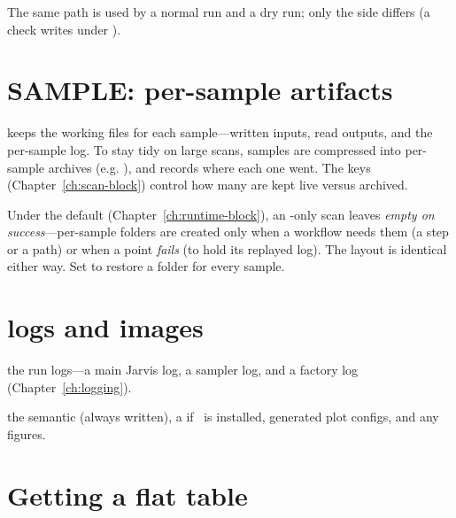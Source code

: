 \begin{jnote}
The same  path is used by a normal run and a  dry run; only
the  side differs (a check writes under ).
\end{jnote}

\section{SAMPLE: per-sample artifacts}
\label{sec:out-sample}

 keeps the working files for each sample---written inputs, read outputs, and the
per-sample log. To stay tidy on large scans, samples are compressed into per-sample archives
(e.g. ), and  records where each one
went. The  keys (Chapter~\ref{ch:scan-block}) control how many are
kept live versus archived.

\begin{jnote}
Under the default  (Chapter~\ref{ch:runtime-block}), an
-only scan leaves  \emph{empty on success}---per-sample folders are
created only when a workflow needs them (a  step or a  path) or
when a point \emph{fails} (to hold its replayed log). The  layout is identical either
way. Set  to restore a folder for every sample.
\end{jnote}

\section{logs and images}
\label{sec:out-logs-images}

\begin{description}[style=nextline, leftmargin=1.2em]
  \item[\file{logs/<scan>/}] the run logs---a main Jarvis log, a sampler log, and a factory log
        (Chapter~\ref{ch:logging}).
  \item[\file{images/<scan>/}] the semantic  (always written), a
         if \JPlot\ is installed, generated plot configs, and any figures.
\end{description}

\section{Getting a flat table}
\label{sec:out-convert}

